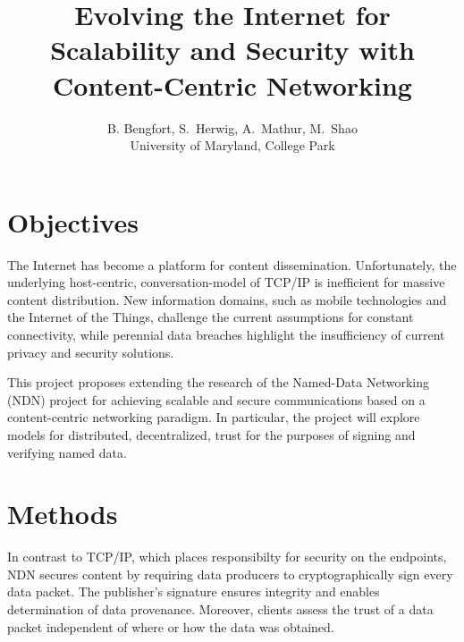 \documentclass[letterpaper,twocolumn,10pt]{article}
\begin{document}
\date{}

\title{\Large \bf Evolving the Internet for Scalability and Security with
    Content-Centric Networking}

\author{
{\rm B. Bengfort, S.\ Herwig, A.\ Mathur, M.\ Shao}\\
University of Maryland, College Park
} %

\maketitle

\thispagestyle{empty}

\section{Objectives}
The Internet has become a platform for content dissemination.  Unfortunately,
the underlying host-centric, conversation-model of TCP/IP is inefficient
for massive content distribution.  New information domains, such as mobile
technologies and the Internet of the Things, challenge the current assumptions
for constant connectivity, while perennial data breaches highlight the
insufficiency of current privacy and security solutions.

This project proposes extending the research of the Named-Data Networking (NDN)
project for achieving scalable and secure communications based on a
content-centric networking paradigm.  In particular, the project will
explore models for distributed, decentralized, trust for the purposes of
signing and verifying named data.

\section*{Methods}
In contrast to TCP/IP, which places responsibilty for security on the
endpoints, NDN secures content by requiring data producers to cryptographically
sign every data packet.  The publisher's signature ensures integrity and
enables determination of data provenance.  Moreover, clients assess the trust
of a data packet independent of where or how the data was obtained.
\end{document}
